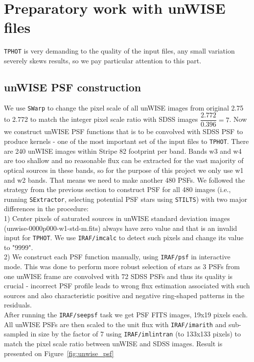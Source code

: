 \section{Preparatory work with unWISE files}
	{\tt TPHOT} is very demanding to the quality of the input files, any small variation severely skews results, so we pay particular attention to this part.
	
\subsection{unWISE PSF construction}
	
We use {\tt SWarp} to change the pixel scale of all unWISE images from original 2.75 to 2.772 to match the integer pixel scale ratio with SDSS images $\dfrac{2.772}{0.396}=7$. Now we construct unWISE PSF functions that is to be convolved with SDSS PSF to produce kernels - one of the most important set of the input files to {\tt TPHOT}. There are 240 unWISE images within Stripe 82 footprint per band. Bands w3 and w4 are too shallow and no reasonable flux can be extracted for the vast majority of optical sources  in these bands, so for the purpose of this project we only use w1 and w2 bands. That means we need to make another 480 PSFs.
We followed the strategy from the previous section to construct PSF for all 480 images (i.e., running {\tt SExtractor}, selecting potential PSF stars using {\tt STILTS}) with two major differences in the procedure:\\
1) Center pixels of saturated sources in unWISE standard deviation images (unwise-0000p000-w1-std-m.fits) always have zero value and that is an invalid input for {\tt TPHOT}. We use {\tt IRAF/imcalc} to detect such pixels and change its value to "9999".\\
2) We construct each PSF function manually, using {\tt IRAF/psf} in interactive mode. This was done to perform more robust selection of stars as 3 PSFs from one unWISE frame are convolved with 72 SDSS PSFs and thus its quality is crucial - incorrect PSF profile leads to wrong flux estimation associated with such sources and also characteristic positive and negative ring-shaped patterns in the residuals. \\
After running the {\tt IRAF/seepsf} task we get PSF FITS images, 19x19 pixels each. All unWISE PSFs are then scaled to the unit flux with {\tt IRAF/imarith} and sub-sampled in size by the factor of 7 using {\tt IRAF/imlintran} (to 133x133 pixels) to match the pixel scale ratio between unWISE and SDSS images. Result is presented on Figure~\ref{fig:unwise_psf}

